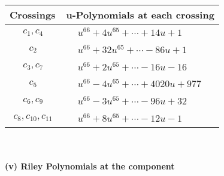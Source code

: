 \documentclass[1p]{elsarticle_modified}
\theoremstyle{definition}
\begin{document}
\begin{tabular}{m{50pt}|m{274pt}}
Crossings & \hspace{64pt}u-Polynomials at each crossing \\
\hline $$\begin{aligned}c_{1},c_{4}\end{aligned}$$&$\begin{aligned}
&u^{66}+4 u^{65}+\cdots+14 u+1
\end{aligned}$\\
\hline $$\begin{aligned}c_{2}\end{aligned}$$&$\begin{aligned}
&u^{66}+32 u^{65}+\cdots-86 u+1
\end{aligned}$\\
\hline $$\begin{aligned}c_{3},c_{7}\end{aligned}$$&$\begin{aligned}
&u^{66}+2 u^{65}+\cdots-16 u-16
\end{aligned}$\\
\hline $$\begin{aligned}c_{5}\end{aligned}$$&$\begin{aligned}
&u^{66}-4 u^{65}+\cdots+4020 u+977
\end{aligned}$\\
\hline $$\begin{aligned}c_{6},c_{9}\end{aligned}$$&$\begin{aligned}
&u^{66}-3 u^{65}+\cdots-96 u+32
\end{aligned}$\\
\hline $$\begin{aligned}c_{8},c_{10},c_{11}\end{aligned}$$&$\begin{aligned}
&u^{66}+8 u^{65}+\cdots-12 u-1
\end{aligned}$\\
\hline
\end{tabular}\\~\\
\newpage\renewcommand{\arraystretch}{1}
\flushleft \textbf{(v) Riley Polynomials at the component}\newline \\
\end{document}
